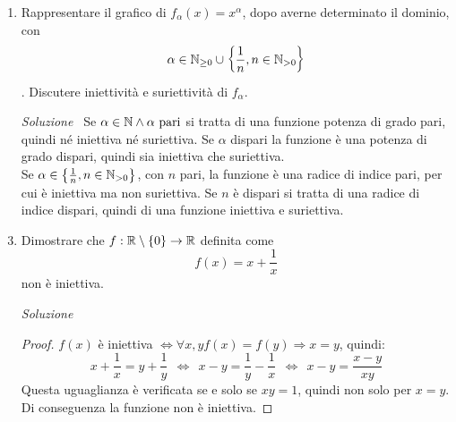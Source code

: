 \documentclass{article}
\begin{document}
\begin{enumerate}[label=\textbf{Esercizio 1.\arabic*.},itemindent=*]
    \begin{figure}[h]
        \centering
    \end{figure}
    \item Rappresentare il grafico di $f_\alpha (x)=x^\alpha$, dopo averne determinato il dominio, con \[\alpha \in \mathbb{N}_{\geq 0} \cup \left\{\frac{1}{n}, n \in \mathbb{N}_{>0}\right\}\]. Discutere iniettività e suriettività di $f_\alpha$.
    \item[\textit{\large Soluzione~}] Se $\alpha \in \mathbb{N} \land \alpha \text{ pari}$ si tratta di una funzione potenza di grado pari, quindi né iniettiva né suriettiva. Se $\alpha$ dispari la funzione è una potenza di grado dispari, quindi sia iniettiva che suriettiva.\\
    Se $\alpha \in \left\{\frac{1}{n}, n \in \mathbb{N}_{>0}\right\}$, con $n$ pari, la funzione è una radice di indice pari, per cui è iniettiva ma non suriettiva. Se $n$ è dispari si tratta di una radice di indice dispari, quindi di una funzione iniettiva e suriettiva.
    \item Dimostrare che $f:\mathbb{R}\setminus \{0\}\to \mathbb{R}$ definita come \[f(x)=x+\frac{1}{x}\] non è iniettiva.
    \item[\textit{\large Soluzione~}] \begin{proof}$f(x)$ è iniettiva $\Leftrightarrow \forall x,y f(x)=f(y)\Rightarrow x=y$, quindi:
    \[x+\frac{1}{x}=y+\frac{1}{y}~~\Leftrightarrow~~x-y=\frac{1}{y}-\frac{1}{x}~~\Leftrightarrow~~x-y=\frac{x-y}{xy}\]
    Questa uguaglianza è verificata se e solo se $xy=1$, quindi non solo per $x=y$. Di conseguenza la funzione non è iniettiva.\end{proof}
\end{enumerate}
\end{document}
